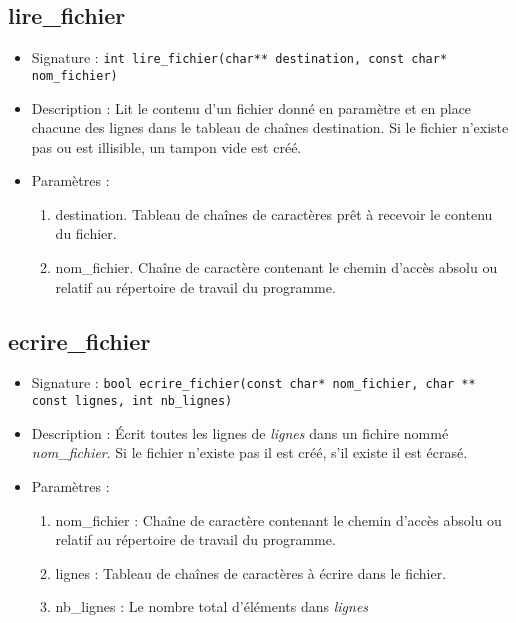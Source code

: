 \documentclass[12pt,pdftex,oneside]{article}
\begin{document}
\subsection{lire\_fichier}
\begin{itemize}
\item Signature : \texttt{int lire\_fichier(char** destination, const char* nom\_fichier)}
\item Description :
  Lit le contenu d'un fichier donné en paramètre et en place chacune des lignes dans le tableau de chaînes destination. Si le fichier n'existe pas ou est illisible, un tampon vide est créé.
\item Paramètres :
  \begin{enumerate}
  \item destination. Tableau de chaînes de caractères prêt à recevoir le contenu du fichier.
  \item nom\_fichier. Chaîne de caractère contenant le chemin d'accès absolu ou relatif au répertoire de travail du programme.
  \end{enumerate}
\end{itemize}

\subsection{ecrire\_fichier}
\begin{itemize}
\item Signature : \texttt{bool ecrire\_fichier(const char* nom\_fichier, char ** const lignes, int nb\_lignes)}
\item Description : Écrit toutes les lignes de \emph{lignes} dans un fichire nommé \emph{nom\_fichier}. Si le fichier n'existe pas il est créé, s'il existe il est écrasé.
\item Paramètres :
  \begin{enumerate}
  \item nom\_fichier : Chaîne de caractère contenant le chemin d'accès absolu ou relatif au répertoire de travail du programme.
  \item lignes : Tableau de chaînes de caractères à écrire dans le fichier.
    \item nb\_lignes : Le nombre total d'éléments dans \emph{lignes}
  \end{enumerate}
\end{itemize}
\end{document}
